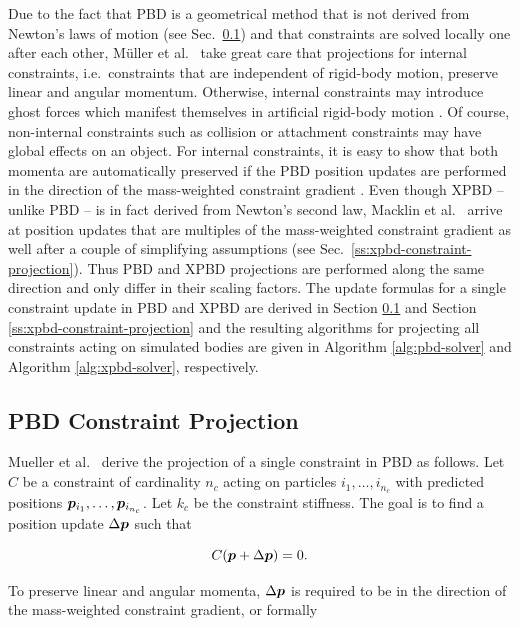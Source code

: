 Due to the fact that PBD is a geometrical method that is not derived from Newton's laws of motion (see Sec.\ \ref{ss:pbd-constraint-projection}) and that 
constraints are solved locally one after each 
other, Müller et al.\ \cite{mueller2006} take great care that projections for internal constraints, i.e.\ constraints that are independent of rigid-body 
motion, preserve linear and angular momentum. Otherwise, internal constraints may introduce ghost forces which manifest themselves in artificial 
rigid-body motion \cite{mueller2006}. Of course, non-internal constraints such as collision or 
attachment constraints may have global effects on an object. For internal constraints, it is easy to show that both momenta are automatically preserved 
if the PBD position updates are performed in the direction of the mass-weighted constraint gradient \cite{mueller2006}. Even though XPBD -- unlike 
PBD -- is in fact derived from Newton's second law, Macklin et al.\ \cite{macklin2016} arrive at position updates that are multiples of the mass-weighted 
constraint gradient as well after a couple of simplifying assumptions (see Sec.\ \ref{ss:xpbd-constraint-projection}). Thus PBD and XPBD projections 
are performed along the same direction and only differ in their scaling factors. The update formulas for a single constraint update in PBD and XPBD are 
derived in Section \ref{ss:pbd-constraint-projection} and Section \ref{ss:xpbd-constraint-projection} and the resulting algorithms for projecting all constraints 
acting on simulated bodies are given in Algorithm \ref{alg:pbd-solver} and Algorithm \ref{alg:xpbd-solver}, respectively.

\subsection{PBD Constraint Projection}\label{ss:pbd-constraint-projection}

Mueller et al.\ \cite{mueller2006} derive the projection of a single constraint in PBD as follows. Let $C$ be a constraint of cardinality $n_c$ 
acting on particles $i_1, \ldots, i_{n_c}$ with predicted positions $\bm{p}_{i_1}, \ldots, \bm{p}_{i_{n_c}}$. Let $k_c$ be the constraint 
stiffness. The goal is to find a position update $\Delta \bm{p}$ such that 

\begin{equation}\label{eq:pbd-delta}
    C(\bm{p} + \Delta \bm{p}) = 0.
\end{equation}

\noindent To preserve linear and angular momenta, $\Delta \bm{p}$ is required to be in the direction of the mass-weighted constraint 
gradient, or formally

